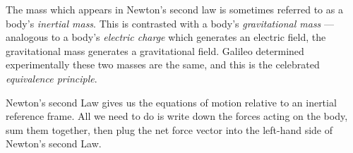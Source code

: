 \begin{remark}
The mass which appears in Newton's second law is sometimes referred to
as a body's \emph{inertial mass}. This is contrasted with a body's
\emph{gravitational mass} --- analogous to a body's \emph{electric charge}
which generates an electric field, the gravitational mass generates a
gravitational field. Galileo determined experimentally these two masses
are the same, and this is the celebrated \emph{equivalence principle}.
\end{remark}

Newton's second Law gives us the equations of motion relative to an
inertial reference frame. All we need to do is write down the forces
acting on the body, sum them together, then plug the net force vector
into the left-hand side of Newton's second Law.

